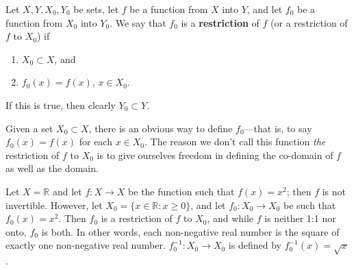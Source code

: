 \documentclass[12pt]{article}
\begin{document}
\begin{defn}
  Let $X,Y,X_0,Y_0$ be sets, let $f$ be a function from $X$ into $Y$, and let $f_0$
  be a function from $X_0$ into $Y_0$. We say that $f_0$ is a \textbf{restriction} of
  $f$ (or a restriction of $f$ to $X_0$) if
  \begin{enumerate}
    \item
      $X_0 \subset X$, and
    \item
      $f_0(x) = f(x)$, $x \in X_0$.
  \end{enumerate}
  If this is true, then clearly $Y_0 \subset Y$.

  Given a set $X_0 \subset X$, there is an obvious way to define $f_0$—that is, to
  say $f_0(x) = f(x)$ for each $x \in X_0$. The reason we don't call this function
  \textit{the} restriction of $f$ to $X_0$ is to give ourselves freedom in defining
  the co-domain of $f$ as well as the domain.
\end{defn}

\begin{exm}
  Let $X = \mathbb{R}$ and let $f:X \to X$ be the function such that $f(x) = x^2$;
  then $f$ is not invertible. However, let $X_0 = \{x \in \mathbb{R}: x \geq 0\}$,
  and let $f_0:X_0 \to X_0$ be such that $f_0(x) = x^2$. Then $f_0$ is a restriction
  of $f$ to $X_0$, and while $f$ is neither 1:1 nor onto, $f_0$ is both. In other
  words, each non-negative real number is the square of exactly one non-negative real
  number. $f_0^{-1}: X_0 \to X_0$ is defined by $f_0^{-1}(x) = \sqrt{x}$.
\end{exm}
\end{document}
